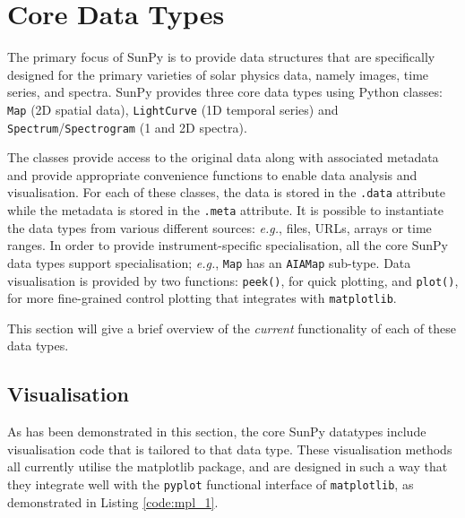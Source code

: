 \section{Core Data Types}\label{sec:DataTypes}

The primary focus of SunPy is to provide data structures 
that are specifically designed for the primary varieties of solar physics data, namely
images, time series, and spectra. SunPy provides three core data
types using Python classes:
\texttt{Map} (2D spatial data),
\texttt{LightCurve} (1D temporal series)
and \texttt{Spectrum}/\texttt{Spectrogram} (1 and 2D spectra). 

The classes provide access to the original data
along with associated metadata and provide appropriate convenience functions to
enable data analysis and visualisation. For each of these classes, the data is
stored in the \texttt{.data} attribute while the metadata is stored 
in the \texttt{.meta} attribute. It is 
possible to instantiate the data types from various different 
sources: \textit{e.g.}, files, URLs, arrays or time ranges.  In order to provide
instrument-specific specialisation, all the core SunPy data types support specialisation;
\textit{e.g.}, \texttt{Map} has an \texttt{AIAMap} sub-type. 
Data visualisation is provided by two functions: \texttt{peek()}, for quick plotting,
and \texttt{plot()}, for more fine-grained control plotting that integrates with 
\texttt{matplotlib}.


This section will give a brief overview of the \textit{current} functionality 
of each of these data types.





\subsection{Visualisation}
\label{subsec:Viz}
As has been demonstrated in this section, the core SunPy datatypes 
include visualisation code that is tailored to that data type. 
These visualisation methods all currently utilise the matplotlib 
package, and are designed in such a way that they integrate well with 
the \texttt{pyplot} functional interface of \texttt{matplotlib}, as demonstrated in 
Listing \ref{code:mpl_1}.

